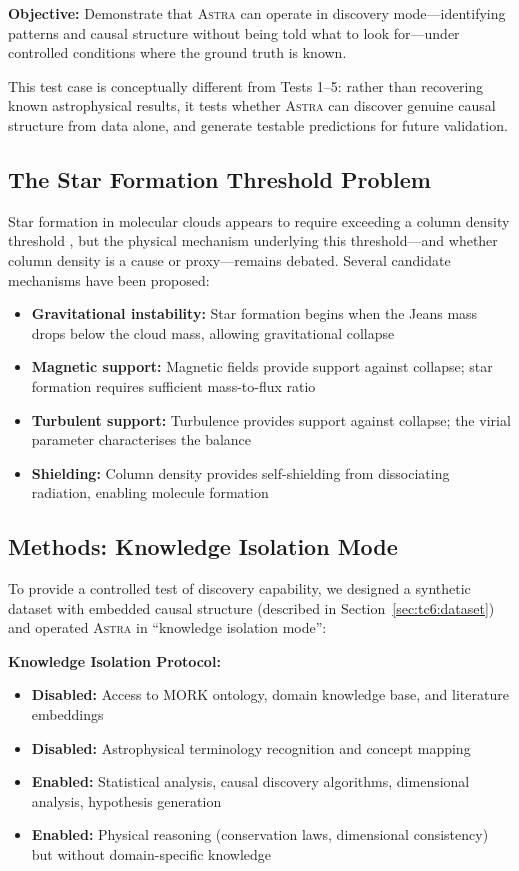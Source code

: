 \documentclass[fleqn,usenatbib]{mnras}
\newcommand{\astra}{\textsc{Astra}\xspace}
\begin{document}
\textbf{Objective:} Demonstrate that \astra can operate in discovery mode---identifying patterns and causal structure without being told what to look for---under controlled conditions where the ground truth is known.

This test case is conceptually different from Tests 1--5: rather than recovering known astrophysical results, it tests whether \astra can discover genuine causal structure from data alone, and generate testable predictions for future validation.

\subsection{The Star Formation Threshold Problem}
\label{sec:tc6:problem}

Star formation in molecular clouds appears to require exceeding a column density threshold \citep{Andre2010}, but the physical mechanism underlying this threshold---and whether column density is a cause or proxy---remains debated.
Several candidate mechanisms have been proposed:
\begin{itemize}
  \item \textbf{Gravitational instability:} Star formation begins when the Jeans mass drops below the cloud mass, allowing gravitational collapse
  \item \textbf{Magnetic support:} Magnetic fields provide support against collapse; star formation requires sufficient mass-to-flux ratio
  \item \textbf{Turbulent support:} Turbulence provides support against collapse; the virial parameter characterises the balance
  \item \textbf{Shielding:} Column density provides self-shielding from dissociating radiation, enabling molecule formation
\end{itemize}

\subsection{Methods: Knowledge Isolation Mode}
\label{sec:tc6:methods}

To provide a controlled test of discovery capability, we designed a synthetic dataset with embedded causal structure (described in Section~\ref{sec:tc6:dataset}) and operated \astra in ``knowledge isolation mode'':

\textbf{Knowledge Isolation Protocol:}
\begin{itemize}
  \item \textbf{Disabled:} Access to MORK ontology, domain knowledge base, and literature embeddings
  \item \textbf{Disabled:} Astrophysical terminology recognition and concept mapping
  \item \textbf{Enabled:} Statistical analysis, causal discovery algorithms, dimensional analysis, hypothesis generation
  \item \textbf{Enabled:} Physical reasoning (conservation laws, dimensional consistency) but without domain-specific knowledge
\end{itemize}
\end{document}
